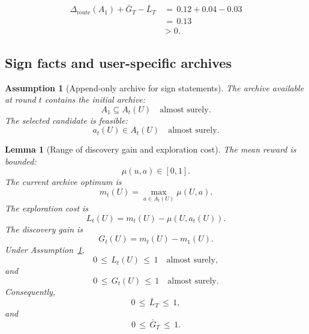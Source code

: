 \documentclass{article} %
\newtheorem{lemma}[theorem]{Lemma}
\newtheorem{assumption}{Assumption}
\begin{document}
\begin{align}
\label{eq:app-fourth-dom-example-reserve}
\Delta_{\mathrm{route}}(A_1)+\bar G_T-\bar L_T
&\,=\,
0.12+0.04-0.03
\\
&\,=\,
0.13
\\
&>
0.
\end{align}

\subsection{Sign facts and user-specific archives}

\begin{assumption}[Append-only archive for sign statements]
\label{assump:app-append-only}
The archive available at round \(t\) contains the initial archive:
\begin{equation}
\label{eq:app-fourth-append-only}
A_1
\subseteq
A_t(U)
\quad
\text{almost surely}.
\end{equation}
The selected candidate is feasible:
\begin{equation}
\label{eq:app-fourth-feasible}
a_t(U)
\in
A_t(U)
\quad
\text{almost surely}.
\end{equation}
\end{assumption}

\begin{lemma}[Range of discovery gain and exploration cost]
\label{lem:5}
The mean reward is bounded:
\begin{equation}
\label{eq:app-fourth-range-mu}
\mu(u,a)\in[0,1].
\end{equation}
The current archive optimum is
\begin{equation}
\label{eq:app-fourth-range-mt}
m_t(U)
=
\max_{a\in A_t(U)}
\mu(U,a).
\end{equation}
The exploration cost is
\begin{equation}
\label{eq:app-fourth-range-lt}
L_t(U)
=
m_t(U)-\mu(U,a_t(U)).
\end{equation}
The discovery gain is
\begin{equation}
\label{eq:app-fourth-range-gt}
G_t(U)
=
m_t(U)-m_1(U).
\end{equation}
Under Assumption~\ref{assump:app-append-only},
\begin{equation}
\label{eq:app-fourth-range-l-bound}
0
\,\le\,
L_t(U)
\,\le\,
1
\quad
\text{almost surely},
\end{equation}
and
\begin{equation}
\label{eq:app-fourth-range-g-bound}
0
\,\le\,
G_t(U)
\,\le\,
1
\quad
\text{almost surely}.
\end{equation}
Consequently,
\begin{equation}
\label{eq:app-fourth-range-avg-l}
0
\,\le\,
\bar L_T
\,\le\,
1,
\end{equation}
and
\begin{equation}
\label{eq:app-fourth-range-avg-g}
0
\,\le\,
\bar G_T
\,\le\,
1.
\end{equation}
\end{lemma}
\end{document}
